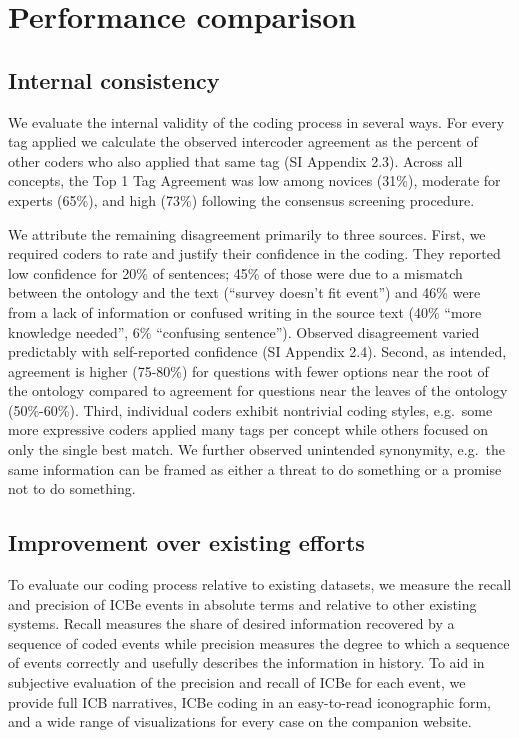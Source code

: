 \documentclass{article}
\begin{document}
\hypertarget{performance-comparison}{%
\section{Performance comparison}\label{performance-comparison}}

\hypertarget{internal-consistency}{%
\subsection{Internal consistency}\label{internal-consistency}}

We evaluate the internal validity of the coding process in several ways.
For every tag applied we calculate the observed intercoder agreement as
the percent of other coders who also applied that same tag (SI Appendix
2.3). Across all concepts, the Top 1 Tag Agreement was low among novices
(31\%), moderate for experts (65\%), and high (73\%) following the
consensus screening procedure.

We attribute the remaining disagreement primarily to three sources.
First, we required coders to rate and justify their confidence in the
coding. They reported low confidence for 20\% of sentences; 45\% of
those were due to a mismatch between the ontology and the text (``survey
doesn't fit event'') and 46\% were from a lack of information or
confused writing in the source text (40\% ``more knowledge needed'', 6\%
``confusing sentence''). Observed disagreement varied predictably with
self-reported confidence (SI Appendix 2.4). Second, as intended,
agreement is higher (75-80\%) for questions with fewer options near the
root of the ontology compared to agreement for questions near the leaves
of the ontology (50\%-60\%). Third, individual coders exhibit nontrivial
coding styles, e.g.~some more expressive coders applied many tags per
concept while others focused on only the single best match. We further
observed unintended synonymity, e.g.~the same information can be framed
as either a threat to do something or a promise not to do something.

\hypertarget{improvement-over-existing-efforts}{%
\subsection{Improvement over existing
efforts}\label{improvement-over-existing-efforts}}

To evaluate our coding process relative to existing datasets, we measure
the recall and precision of ICBe events in absolute terms and relative
to other existing systems. Recall measures the share of desired
information recovered by a sequence of coded events while precision
measures the degree to which a sequence of events correctly and usefully
describes the information in history. To aid in subjective evaluation of
the precision and recall of ICBe for each event, we provide full ICB
narratives, ICBe coding in an easy-to-read iconographic form, and a wide
range of visualizations for every case on the companion website.
\end{document}
